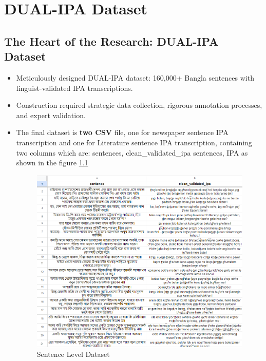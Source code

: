 \chapter{DUAL-IPA Dataset}

\section{The Heart of the Research: DUAL-IPA Dataset}
\begin{itemize}
    \item Meticulously designed DUAL-IPA dataset: 160,000+ Bangla sentences with linguist-validated IPA transcriptions.
    \item Construction required strategic data collection, rigorous annotation processes, and expert validation.
    \item The final dataset is \textbf{two CSV} file, one for newspaper sentence IPA transcription and one for Literature sentence IPA transcription, containing two columns which are: sentences, clean\_validated\_ipa sentences, IPA as shown in the figure \ref{fig:Sentence Dataset}
         \begin{figure}[htbp]
    \centering
    \includegraphics[scale=0.6]{Images/Screenshot/Sentence-dataset.png}
    \caption{Sentence Level Dataset}
    \label{fig:Sentence Dataset}
\end{figure} 
\end{itemize}
